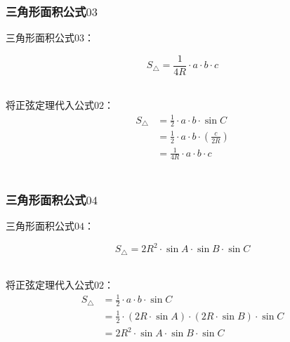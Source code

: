 \documentclass[UTF8]{ctexart}
\begin{document}
\newpage

\subsubsection{三角形面积公式$03$}
    三角形面积公式$03$：
    \begin{large}
        \begin{equation*}
            S_{\triangle}=\frac{1}{4R}\cdot a\cdot b\cdot c
        \end{equation*}
    \end{large}\\
    将正弦定理代入公式$02$：
    \setcounter{equation}{0}
    \begin{align}
        S_{\triangle}
        &=\frac{1}{2}\cdot a\cdot b\cdot\sin{C}\\[3mm]
        &=\frac{1}{2}\cdot a\cdot b\cdot\left(\frac{c}{2R}\right)\\[3mm]
        &=\frac{1}{4R}\cdot a\cdot b\cdot c
    \end{align}\\[2mm]

\subsubsection{三角形面积公式$04$}
    三角形面积公式$04$：
    \begin{large}
        \begin{equation*}
            S_{\triangle}=2R^2\cdot\sin{A}\cdot\sin{B}\cdot\sin{C}
        \end{equation*}
    \end{large}\\
    将正弦定理代入公式$02$：
    \begin{align}
        S_{\triangle}
        &=\frac{1}{2}\cdot  a\cdot b\cdot\sin{C}\\[3mm]
        &=\frac{1}{2}\cdot(2R\cdot\sin{A})\cdot(2R\cdot\sin{B})\cdot\sin{C}\\[3mm]
        &=2R^2\cdot\sin{A}\cdot\sin{B}\cdot\sin{C}
    \end{align}

\newpage
\end{document}
